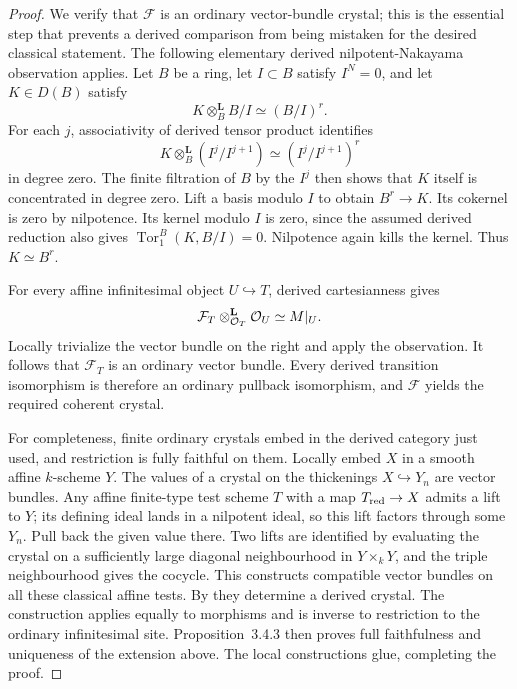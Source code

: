 \begin{proof}
We verify that $\mathcal F$ is an ordinary vector-bundle crystal; this is the essential step that prevents a derived comparison from being mistaken for the desired classical statement.  The following elementary derived nilpotent-Nakayama observation applies.  Let $B$ be a ring, let $I\subset B$ satisfy $I^N=0$, and let $K\in D(B)$ satisfy
\[
                        K\otimes_B^{\mathbf L}B/I\simeq(B/I)^r.
\]
For each $j$, associativity of derived tensor product identifies
\[
 K\otimes_B^{\mathbf L}(I^j/I^{j+1})
      \simeq (I^j/I^{j+1})^r
\]
in degree zero.  The finite filtration of $B$ by the $I^j$ then shows that $K$ itself is concentrated in degree zero.  Lift a basis modulo $I$ to obtain $B^r\to K$.  Its cokernel is zero by nilpotence.  Its kernel modulo $I$ is zero, since the assumed derived reduction also gives $\operatorname{Tor}_1^B(K,B/I)=0$.  Nilpotence again kills the kernel.  Thus $K\simeq B^r$.

For every affine infinitesimal object $U\hookrightarrow T$, derived cartesianness gives
\[
             \mathcal F_T\otimes_{\mathcal O_T}^{\mathbf L}\mathcal O_U
                            \simeq M|_U .
\]
Locally trivialize the vector bundle on the right and apply the observation.  It follows that $\mathcal F_T$ is an ordinary vector bundle.  Every derived transition isomorphism is therefore an ordinary pullback isomorphism, and $\mathcal F$ yields the required coherent crystal.

For completeness, finite ordinary crystals embed in the derived category just used, and restriction is fully faithful on them.  Locally embed $X$ in a smooth affine $k$-scheme $Y$.  The values of a crystal on the thickenings $X\hookrightarrow Y_n$ are vector bundles.  Any affine finite-type test scheme $T$ with a map $T_{\rm red}\to X$ admits a lift to $Y$; its defining ideal lands in a nilpotent ideal, so this lift factors through some $Y_n$.  Pull back the given value there.  Two lifts are identified by evaluating the crystal on a sufficiently large diagonal neighbourhood in $Y\times_kY$, and the triple neighbourhood gives the cocycle.  This constructs compatible vector bundles on all these classical affine tests.  By \cite[Corollary~2.2.2]{GaitsgoryRozenblyum2014} they determine a derived crystal.  The construction applies equally to morphisms and is inverse to restriction to the ordinary infinitesimal site.  Proposition~3.4.3 then proves full faithfulness and uniqueness of the extension above.  The local constructions glue, completing the proof.
\end{proof}


